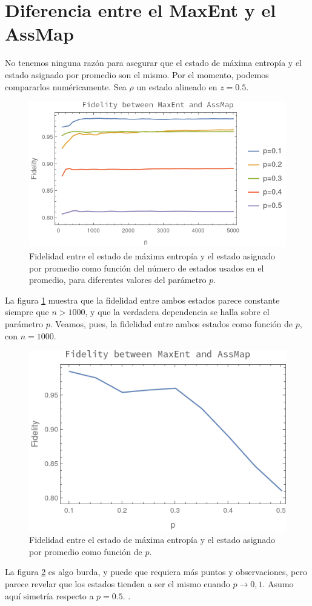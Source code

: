 \section{Diferencia entre el MaxEnt y el AssMap}
No tenemos ninguna razón para asegurar que el estado de máxima entropía y el estado asignado por promedio son el mismo. Por el momento, podemos compararlos numéricamente. Sea $\rho$ un estado alineado en $z=0.5$. 
\begin{figure}[h!]
    \centering
    \includegraphics[width=0.6\linewidth]{general/figures/fidelityMaxEntAssMap_vs_n.png}
    \caption{Fidelidad entre el estado de máxima entropía y el estado asignado por promedio como función del número de estados usados en el promedio, para diferentes valores del parámetro $p$.}
    \label{fig:FidMaxEntAssMapN}
\end{figure}
La figura \ref{fig:FidMaxEntAssMapN} muestra que la fidelidad entre ambos estados parece constante siempre que $n>1000$, y que la verdadera dependencia se halla sobre el parámetro $p$. Veamos, pues, la fidelidad entre ambos estados como función de $p$, con $n=1000$.
\begin{figure}[h!]
    \centering
    \includegraphics[width=0.6\linewidth]{general/figures/fidelityMaxEntAssMap_vs_p.png}
    \caption{Fidelidad entre el estado de máxima entropía y el estado asignado por promedio como función de $p$.}
    \label{fig:FidMaxEntAssMapP}
\end{figure}
La figura \ref{fig:FidMaxEntAssMapP} es algo burda, y puede que requiera más puntos y observaciones, pero parece revelar que los estados tienden a ser el mismo cuando $p\rightarrow 0,1$. Asumo aquí simetría respecto a $p=0.5$. .